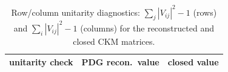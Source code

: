 \begin{table}[t]
\centering
\small
\setlength{\tabcolsep}{10pt}
\renewcommand{\arraystretch}{1.15}
\begin{tabular}{lrr}
\toprule
unitarity check & PDG recon.\ value & closed value \\
\midrule
%
\end{tabular}
\caption{Row/column unitarity diagnostics: $\sum_j |V_{ij}|^2-1$ (rows) and $\sum_i |V_{ij}|^2-1$ (columns) for the reconstructed and closed CKM matrices.}
\label{tab:ckm_unitarity}
\end{table}


